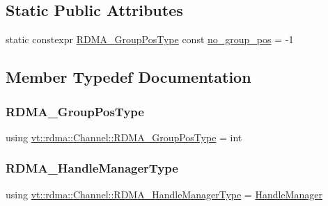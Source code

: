 \subsection*{Static Public Attributes}
\begin{DoxyCompactItemize}
\item 
static constexpr \hyperlink{structvt_1_1rdma_1_1_channel_ae67759ab26cc035489edd369ae207cfc}{R\+D\+M\+A\+\_\+\+Group\+Pos\+Type} const \hyperlink{structvt_1_1rdma_1_1_channel_a5b8e4d79d272951f51a9856705110d24}{no\+\_\+group\+\_\+pos} = -\/1
\end{DoxyCompactItemize}


\subsection{Member Typedef Documentation}
\mbox{\label{structvt_1_1rdma_1_1_channel_ae67759ab26cc035489edd369ae207cfc}} 
\subsubsection{\texorpdfstring{R\+D\+M\+A\+\_\+\+Group\+Pos\+Type}{RDMA\_GroupPosType}}
{\footnotesize\ttfamily using \hyperlink{structvt_1_1rdma_1_1_channel_ae67759ab26cc035489edd369ae207cfc}{vt\+::rdma\+::\+Channel\+::\+R\+D\+M\+A\+\_\+\+Group\+Pos\+Type} =  int}

\mbox{\label{structvt_1_1rdma_1_1_channel_ad558d07a917519f3e713fc41496a5ef7}} 
\subsubsection{\texorpdfstring{R\+D\+M\+A\+\_\+\+Handle\+Manager\+Type}{RDMA\_HandleManagerType}}
{\footnotesize\ttfamily using \hyperlink{structvt_1_1rdma_1_1_channel_ad558d07a917519f3e713fc41496a5ef7}{vt\+::rdma\+::\+Channel\+::\+R\+D\+M\+A\+\_\+\+Handle\+Manager\+Type} =  \hyperlink{structvt_1_1rdma_1_1_handle_manager}{Handle\+Manager}}

